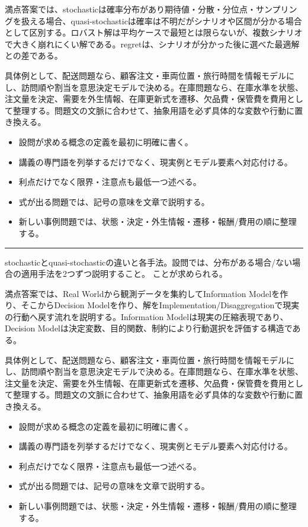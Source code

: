 満点答案では、stochasticは確率分布があり期待値・分散・分位点・サンプリングを扱える場合、quasi-stochasticは確率は不明だがシナリオや区間が分かる場合として区別する。ロバスト解は平均ケースで最短とは限らないが、複数シナリオで大きく崩れにくい解である。regretは、シナリオが分かった後に選べた最適解との差である。\par
{}
具体例として、配送問題なら、顧客注文・車両位置・旅行時間を情報モデルにし、訪問順や割当を意思決定モデルで決める。在庫問題なら、在庫水準を状態、注文量を決定、需要を外生情報、在庫更新式を遷移、欠品費・保管費を費用として整理する。問題文の文脈に合わせて、抽象用語を必ず具体的な変数や行動に置き換える。\par
{}
\begin{itemize}
\item 設問が求める概念の定義を最初に明確に書く。
\item 講義の専門語を列挙するだけでなく、現実例とモデル要素へ対応付ける。
\item 利点だけでなく限界・注意点も最低一つ述べる。
\item 式が出る問題では、記号の意味を文章で説明する。
\item 新しい事例問題では、状態・決定・外生情報・遷移・報酬/費用の順に整理する。
\end{itemize}
\vspace{2mm}\hrule\vspace{2mm}
stochasticとquasi-stochasticの違いと各手法。設問では、分布がある場合/ない場合の適用手法を2つずつ説明すること。 ことが求められる。\par
{}
満点答案では、Real Worldから観測データを集約してInformation Modelを作り、そこからDecision Modelを作り、解をImplementation/Disaggregationで現実の行動へ戻す流れを説明する。Information Modelは現実の圧縮表現であり、Decision Modelは決定変数、目的関数、制約により行動選択を評価する構造である。\par
{}
具体例として、配送問題なら、顧客注文・車両位置・旅行時間を情報モデルにし、訪問順や割当を意思決定モデルで決める。在庫問題なら、在庫水準を状態、注文量を決定、需要を外生情報、在庫更新式を遷移、欠品費・保管費を費用として整理する。問題文の文脈に合わせて、抽象用語を必ず具体的な変数や行動に置き換える。\par
{}
\begin{itemize}
\item 設問が求める概念の定義を最初に明確に書く。
\item 講義の専門語を列挙するだけでなく、現実例とモデル要素へ対応付ける。
\item 利点だけでなく限界・注意点も最低一つ述べる。
\item 式が出る問題では、記号の意味を文章で説明する。
\item 新しい事例問題では、状態・決定・外生情報・遷移・報酬/費用の順に整理する。
\end{itemize}
